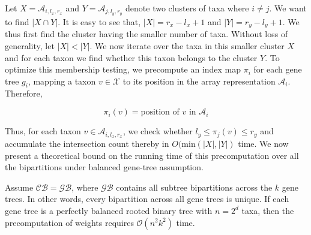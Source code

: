 \documentclass[10pt,a4paper]{article}
\begin{document}
Let $X = \mathcal{A}_{i,l_{x},r_{x}}$ and $Y = \mathcal{A}_{j,l_{y},r_{y}}$ denote two clusters of taxa where $i \neq j$. We want to find $|X \cap Y|$. It is easy to see that, $|X| = r_x - l_x+1$ and $|Y| = r_y - l_y+1$. We thus first find the cluster having the smaller number of taxa. Without loss of generality, let $|X| < |Y|$. We now iterate over the taxa in this smaller cluster $X$ and for each taxon we find whether this taxon belongs to the cluster $Y$. To optimize this membership testing, we precompute an index map $\pi_i$ for each gene tree $g_i$, mapping a taxon $v \in \mathcal{X}$ to its position in the array representation $\mathcal{A}_i$. Therefore, 

\[
\pi_i(v) = \text{position of } v \text{ in } \mathcal{A}_i
\]

Thus, for each taxon $v \in \mathcal{A}_{i,l_{x},r_{x}}$, we check whether $l_y \leq \pi_j(v) \leq r_y$ and accumulate the intersection count thereby in $O(\text{min}(|X|,|Y|)$ time. We now present a theoretical bound on the running time of this precomputation over all the bipartitions under balanced gene-tree assumption.




\begin{theorem}
\label{th:precompute-bound}
Assume $\mathcal{CB} = \mathcal{GB}$, where $\mathcal{GB}$ contains all subtree bipartitions across the $k$ gene trees. In other words, every bipartition across all gene trees is unique. If each gene tree is a perfectly balanced rooted binary tree with $n = 2^{d}$ taxa, then the precomputation of weights requires $\mathcal{O}(n^{2}k^{2})$ time.

\end{theorem}
\end{document}
